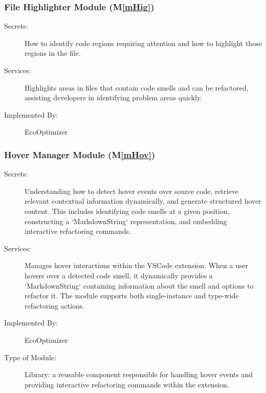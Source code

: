 \documentclass[12pt, titlepage]{article}
\newcommand{\mref}[1]{M\ref{#1}}
\begin{document}
\subsubsection{File Highlighter Module (\mref{mHig})}


\begin{description}
    \item[Secrets:] How to identify code regions requiring attention and how to highlight those regions in the file.
    \item[Services:] Highlights areas in files that contain code smells and can be refactored, assisting developers in identifying problem areas quickly.
    \item[Implemented By:] EcoOptimizer
\end{description}


\subsubsection{Hover Manager Module (\mref{mHov})}

\begin{description}
    \item[Secrets:] Understanding how to detect hover events over source code, retrieve relevant contextual information dynamically, and generate structured hover content. This includes identifying code smells at a given position, constructing a `MarkdownString` representation, and embedding interactive refactoring commands.

    \item[Services:] Manages hover interactions within the VSCode extension. When a user hovers over a detected code smell, it dynamically provides a `MarkdownString` containing information about the smell and options to refactor it. The module supports both single-instance and type-wide refactoring actions.

    \item[Implemented By:] EcoOptimizer
    \item[Type of Module:] Library: a reusable component responsible for handling hover events and providing interactive refactoring commands within the extension.
\end{description}
\end{document}
